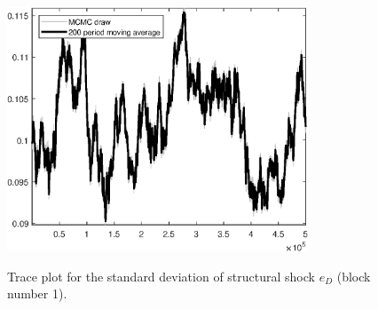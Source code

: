 \begin{figure}[H]
\centering
  \includegraphics[width=0.8\textwidth]{BRS_growth_ext_fd/graphs/TracePlot_SE_e_D_blck_1}\\
    \caption{Trace plot for the standard deviation of structural shock ${e_D}$ (block number 1).}
\end{figure}

